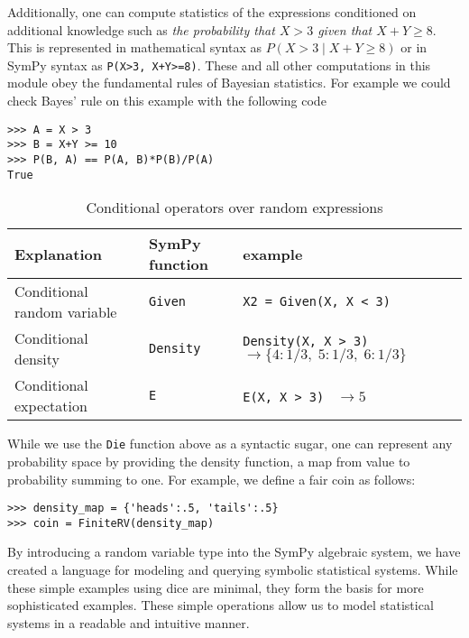 Additionally, one can compute statistics of the expressions conditioned
on additional knowledge such as \textit{the probability that $X > 3$ given that $X+Y \ge 8$}. This is represented in mathematical syntax as $P(X>3 \;|\; X+Y \ge 8)$ or in SymPy syntax as {\tt P(X>3, X+Y>=8)}. These and all other computations in this module obey the fundamental rules of Bayesian statistics. For example we could check Bayes' rule on this example with the following code
\begin{lstlisting}
>>> A = X > 3
>>> B = X+Y >= 10
>>> P(B, A) == P(A, B)*P(B)/P(A)
True
\end{lstlisting}



\begin{table}[h]
\begin{tabular}{|lll|}
\hline
Explanation & SymPy function & example\\ \hline
Conditional random variable & {\tt Given} & {\tt X2 = Given(X, X < 3)} \\ \hline
Conditional density & {\tt Density} & {\tt Density(X, X > 3) } $\rightarrow \{4: 1/3,\; 5: 1/3,\; 6: 1/3\}$ \\ \hline
Conditional expectation  & {\tt E} & {\tt E(X, X > 3) } $\rightarrow 5$ \\ \hline
\end{tabular}
\caption{Conditional operators over random expressions}
\label{tab:cond_ops}
\end{table}

While we use the {\tt Die} function above as a syntactic sugar, one can
represent any probability space by providing the density function, a map
from value to probability summing to one. For example, we define a fair coin as follows:
\begin{lstlisting}
>>> density_map = {'heads':.5, 'tails':.5}
>>> coin = FiniteRV(density_map)
\end{lstlisting}

By introducing a random variable type into the SymPy algebraic system, we have
created a language for modeling and querying symbolic statistical systems.
While these simple examples using dice are minimal, they form the basis for more
sophisticated examples.  These simple operations allow us to model statistical
systems in a readable and intuitive manner.
